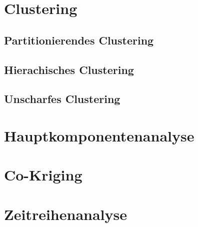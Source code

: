 \section{Clustering}
\subsection{Partitionierendes Clustering}
\subsection{Hierachisches Clustering}
\subsection{Unscharfes Clustering}

\section{Hauptkomponentenanalyse}

\section{Co-Kriging}

\section{Zeitreihenanalyse}




